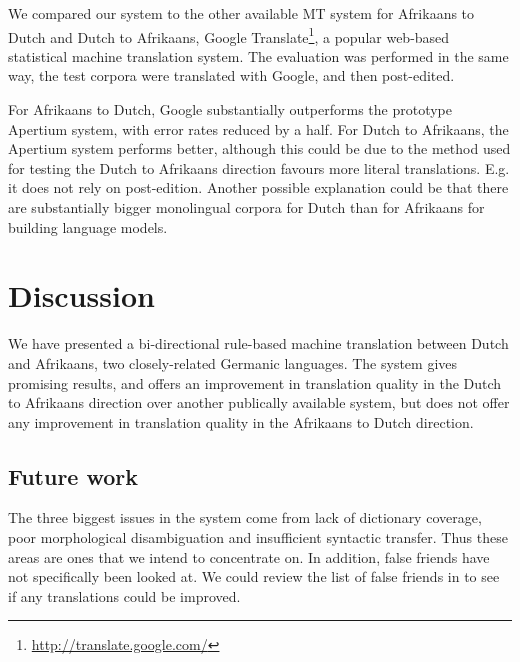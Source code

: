 \documentclass[11pt]{article}
\begin{document}
We compared our system to the other available MT system for Afrikaans to Dutch and Dutch to Afrikaans, 
Google Translate\footnote{\url{http://translate.google.com/}}, a popular web-based statistical machine
translation system. The evaluation was performed in the same way, the test corpora were translated with 
Google, and then post-edited.

For Afrikaans to Dutch, Google substantially outperforms the prototype Apertium system, with error rates 
reduced by a half. For Dutch to Afrikaans, the Apertium system performs better, although this could 
be due to the method used for testing the Dutch to Afrikaans direction favours more literal translations. E.g. 
it does not rely on post-edition. Another possible explanation could be that there are substantially bigger
monolingual corpora for Dutch than for Afrikaans for building language models.



\section{Discussion}

We have presented a bi-directional rule-based machine translation between Dutch and Afrikaans, 
two closely-related Germanic languages. The system gives promising results, and offers an improvement
in translation quality in the Dutch to Afrikaans direction over another publically available system, 
but does not offer any improvement in translation quality in the Afrikaans to Dutch direction.

\subsection{Future work}

The three biggest issues in the system come from lack of dictionary coverage, poor morphological
disambiguation and insufficient syntactic transfer. Thus these areas are ones that we intend to 
concentrate on. In addition, false friends have not specifically been looked at. We could review
the list of false friends in \cite{Huyssteen:09} to see if any translations could be improved.
\end{document}
